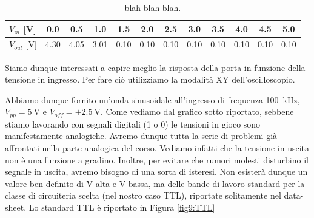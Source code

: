 \begin{table}[htpc]
\centering
\begin{tabular}{l|c|c|c|c|c|c|c|c|c|c|c}
$V_{in}$ [\si{\volt}] & 0.0 & 0.5 & 1.0 & 1.5 & 2.0 & 2.5 & 3.0 & 3.5 & 4.0 & 4.5 & 5.0 \\
\hline
$V_{out}$ [\si{\volt}] & 4.30 & 4.05 & 3.01 & 0.10 & 0.10 & 0.10 & 0.10 & 0.10 & 0.10 & 0.10 & 0.10 \\
\end{tabular}
\caption{blah blah blah.}
\label{tab9:risposta2}
\end{table}

Siamo dunque interessati a capire meglio la risposta della porta in funzione della tensione in ingresso.
Per fare ciò utilizziamo la modalità XY dell'oscilloscopio.

Abbiamo dunque fornito un'onda sinusoidale all'ingresso di frequenza \SI{100}{\kilo\hertz}, $V_{pp}=\SI{5}{\volt}$ e $V_{off}=+\SI{2.5}{\volt}$.
Come vediamo dal grafico sotto riportato, sebbene stiamo lavorando con segnali digitali (1 o 0) le tensioni in gioco sono manifestamente analogiche.
Avremo dunque tutta la serie di problemi già affrontati nella parte analogica del corso.
Vediamo infatti che la tensione in uscita non è una funzione a gradino.
Inoltre, per evitare che rumori molesti disturbino il segnale in uscita, avremo bisogno di una sorta di isteresi.
Non esisterà dunque un valore ben definito di V alta e V bassa, ma delle bande di lavoro standard per la classe di circuiteria scelta (nel nostro caso TTL), riportate solitamente nel data-sheet.
Lo standard TTL è riportato in Figura \ref{fig9:TTL}

